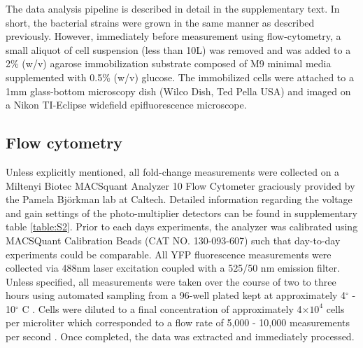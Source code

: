 The data analysis pipeline is described in detail in the supplementary text. In
short, the bacterial strains were grown in the same manner as described
previously. However, immediately before measurement using flow-cytometry, a
small aliquot of cell suspension (less than 10\textmu L) was removed and was
added to a 2\% (w/v) agarose immobilization substrate composed of M9 minimal
media supplemented with 0.5\% (w/v) glucose. The immobilized cells were
attached to a 1mm glass-bottom microscopy dish (Wilco Dish, Ted Pella USA) and
imaged on a Nikon TI-Eclipse widefield epifluorescence microscope.


\subsection*{Flow cytometry}
Unless explicitly mentioned, all fold-change measurements were collected on a
Miltenyi Biotec MACSquant Analyzer 10 Flow Cytometer graciously provided by the
Pamela Bj\"{o}rkman lab at Caltech. Detailed information regarding the voltage
and gain  settings of the photo-multiplier detectors can be found in
supplementary table \ref{table:S2}. Prior to each days experiments, the
analyzer was calibrated using MACSQuant Calibration Beads (CAT NO. 130-093-607)
such that day-to-day experiments could be comparable. All YFP fluorescence
measurements were collected via 488nm laser excitation  coupled with a 525/50
nm emission filter. Unless specified, all measurements were  taken over the
course of two to three hours using automated sampling from a 96-well plated
kept at approximately 4$^\circ$ - 10$^\circ$ C . Cells were diluted to a final concentration of
approximately 4$\times 10^{4}$ cells per microliter which corresponded to a
flow rate of 5,000 - 10,000 measurements per second . Once completed, the data
was extracted and immediately  processed. 

